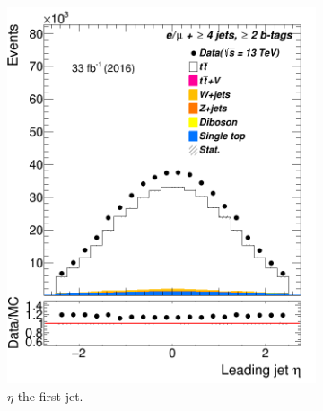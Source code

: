 \begin{figure}
	\begin{subfigure}{0.25\textwidth}
		\includegraphics[width=\linewidth]{ControlPlots_emujets_2016_4incl_2incl/jet0_eta_emujets_2016.png}
		\caption{$\eta$ the first jet.} \label{fig:Sec19}
	\end{subfigure}\hspace*{0.5cm}
\begin{subfigure}{0.25\textwidth}

\end{subfigure}
\end{figure}
